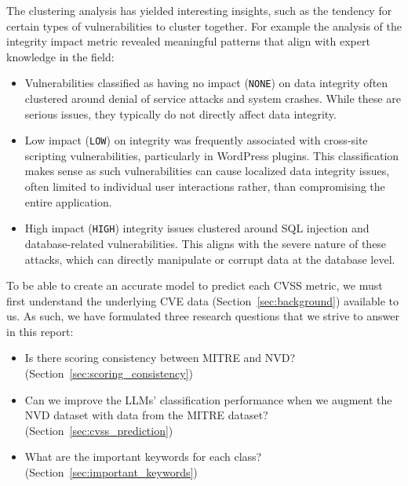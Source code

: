 \documentclass[12pt]{article}
\begin{document}
The clustering analysis has yielded interesting insights, such as the tendency for certain types of
vulnerabilities to cluster together. For example the analysis of the integrity impact metric revealed meaningful patterns that align with expert knowledge in the field:

\begin{itemize}

	\item Vulnerabilities classified as having no impact (\texttt{NONE}) on data integrity often
	      clustered around denial of service attacks and system crashes. While these are serious
	      issues, they typically do not directly affect data integrity.

	\item Low impact (\texttt{LOW}) on integrity was frequently associated with cross-site scripting
	      vulnerabilities, particularly in WordPress plugins. This classification makes sense as such
	      vulnerabilities can cause localized data integrity issues, often limited to individual user
	      interactions rather, than compromising the entire application.

	\item High impact (\texttt{HIGH}) integrity issues clustered around SQL injection and
	      database-related vulnerabilities. This aligns with the severe nature of these attacks, which
	      can directly manipulate or corrupt data at the database level.

\end{itemize}


To be able to create an accurate model to predict each CVSS metric, we must first understand the
underlying CVE data (Section~\ref{sec:background}) available to us. As such, we have formulated three research
questions that we strive to answer in this report:

\begin{itemize}

	\item Is there scoring consistency between MITRE and NVD? (Section~\ref{sec:scoring_consistency})

	\item Can we improve the LLMs’ classification performance when we augment the NVD dataset with data
	      from the MITRE dataset? (Section~\ref{sec:cvss_prediction})

	\item What are the important keywords for each class? (Section~\ref{sec:important_keywords})

\end{itemize}
\end{document}
